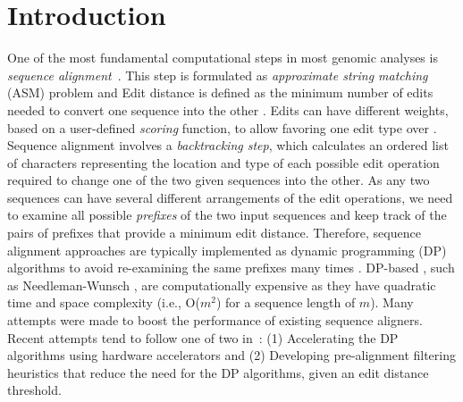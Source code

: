 \section{Introduction} \label{sec:introduction}
One of the most fundamental computational steps in most genomic analyses is {\emph{sequence alignment}}~\citep{alser2020technology, senol2019nanopore}. 
This step is formulated as  \emph{approximate string matching} (ASM) problem \citep{navarro2001guided} and 
Edit distance is defined as the minimum number of edits needed to convert one sequence into the other \citep{levenshtein1966binary}. 
Edits can have different weights, based on a user-defined \emph{scoring} function, to allow favoring one edit type over  \citep{wang2011comparison}. 
Sequence alignment involves a \emph{backtracking step}, which calculates an ordered list of characters representing the location and type of each possible edit operation required to change one of the two given sequences into the other. 
As any two sequences can have several different arrangements of the edit operations, we need to examine all possible \emph{prefixes} of the two input sequences and keep track of the pairs of prefixes that provide a minimum edit distance. 
Therefore, sequence alignment approaches are typically implemented as dynamic programming (DP) algorithms to avoid re-examining the same prefixes {many times} \citep{alser2020technology,eddy2004dynamic}. 
DP-based , such as Needleman-Wunsch \citep{needleman1970general}, are computationally expensive as they have quadratic time and space complexity (i.e., O($m^2$) for a sequence length of $m$). Many attempts were made to boost the performance of existing sequence aligners. Recent attempts tend to follow one of two  in~\citep{alser2020accelerating}: (1) Accelerating the DP algorithms using hardware accelerators and (2) Developing pre-alignment filtering heuristics that reduce the need for the DP algorithms, given an edit distance threshold.

